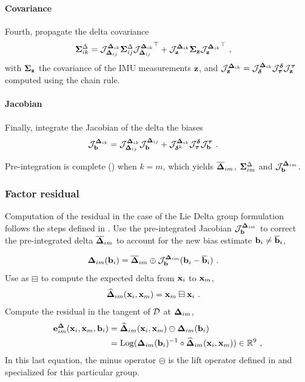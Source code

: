 \paragraph{Covariance}
Fourth, propagate the delta covariance
%
\begin{align}
    {\bm \Sigma}^\Delta_{ik} &= {\mathcal{J}^{{{\bm \Delta}}_{ik}}_{{{\bm \Delta}}_{ij}}}{\bm \Sigma}^\Delta_{ij}{\mathcal{J}^{{{\bm \Delta}}_{ik}}_{{{\bm \Delta}}_{ij}}}^{\top} 
    + {\mathcal{J}^{{{\bm \Delta}}_{ik}}_{{\bf z}}}{\bm \Sigma}_{\bf z}{\mathcal{J}^{{{\bm \Delta}}_{ik}}_{{\bf z}}}^{\top}
    ~,
\end{align}    
%
with ${\bm \Sigma}_{\bf z}$ the covariance of the IMU measurements ${\bf z}$, and ${\mathcal{J}^{{{\bm \Delta}}_{ik}}_{{\bf z}}}={\mathcal{J}^{{{\bm \Delta}}_{ik}}_{\bm\delta}}{\mathcal{J}^{\bm\delta}_{{\bm \tau}}}{\mathcal{J}^{{\bm \tau}}_{{\bf z}}}$ computed using the chain rule. 

\paragraph{Jacobian}
Finally, integrate the Jacobian of the delta \wrt the biases
%
\begin{align}
    {\mathcal{J}^{{{\bm \Delta}}_{ik}}_{{\bf b}}} &= {\mathcal{J}^{{{\bm \Delta}}_{ik}}_{{{\bm \Delta}}_{ij}}}{\mathcal{J}^{{{\bm \Delta}}_{ij}}_{{\bf b}}} 
    + {\mathcal{J}^{{{\bm \Delta}}_{ik}}_{\bm\delta^k}}{\mathcal{J}^{\bm\delta}_{{\bm \tau}}}{\mathcal{J}^{{\bm \tau}}_{{\bf b}}}
    ~.
\end{align}
%

\bigskip

Pre-integration is complete () when $k=m$, which yields $\overline{{{\bm \Delta}}}_{im}$, ${\bm \Sigma}^\Delta_{im}$ and ${\mathcal{J}^{{{\bm \Delta}}_{im}}_{{\bf b}}}$.


\subsubsection{Factor residual}
Computation of the residual in the case of the Lie Delta group formulation follows the steps defined in .
Use the pre-integrated Jacobian ${\mathcal{J}^{{{\bm \Delta}}_{im}}_{{\bf b}}}$ to correct the pre-integrated delta $\overline{{{\bm \Delta}}}_{im}$ to account for the new bias estimate ${\bf b}_i\neq\overline{{\bf b}}_i$,

\begin{align}
    {{\bm \Delta}}_{im}({\bf b}_i) &= \overline{{{\bm \Delta}}}_{im}\oplus{\mathcal{J}^{{{\bm \Delta}}_{im}}_{{\bf b}}}({\bf b}_i-\overline{{\bf b}}_i) 
    ~.
\end{align}
%
Use  as $\boxminus$ to compute the expected delta from  ${\bf x}_i$ to ${\bf x}_m$,
%
\begin{align}
    \widehat{{{\bm \Delta}}}_{im}({\bf x}_i,{\bf x}_m) &= {\bf x}_m \boxminus {\bf x}_i 
    ~.
\end{align}
%
Compute the residual in the  tangent of $\mathcal{D}$ at ${{\bm \Delta}}_{im}$,
%
\begin{align}
    {\bf e}^{{\bm \Delta}}_{im}({\bf x}_i,{\bf x}_m,{\bf b}_i) 
    &=\widehat{{{\bm \Delta}}}_{im}({\bf x}_i,{\bf x}_m) \ominus {{\bm \Delta}}_{im}({\bf b}_i) \\
    &=\operatorname*{Log}({{\bm \Delta}}_{im}({\bf b}_i)^{-1} \circ \widehat{{{\bm \Delta}}}_{im}({\bf x}_i,{\bf x}_m)) \in {\mathbb R}^9
~,
\end{align}
%
In this last equation, the minus operator $\ominus$ is the lift operator defined in  and specialized for this particular group.

